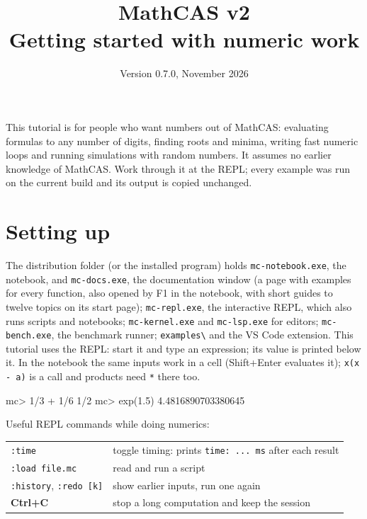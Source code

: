 \documentclass[11pt,a4paper]{article}
\title{\textbf{MathCAS v2}\\[4pt]\large Getting started with numeric work}
\author{}
\date{Version 0.7.0, November 2026}
\newcommand{\code}[1]{\texttt{#1}}
\begin{document}
\maketitle
\thispagestyle{empty}

\noindent This tutorial is for people who want numbers out of MathCAS: evaluating formulas to any number of
digits, finding roots and minima, writing fast numeric loops and running simulations with random numbers. It
assumes no earlier knowledge of MathCAS. Work through it at the REPL; every example was run on the current
build and its output is copied unchanged.

\tableofcontents

\section{Setting up}

The distribution folder (or the installed program) holds \code{mc-notebook.exe}, the notebook, and
\code{mc-docs.exe}, the documentation window (a page with examples for every function, also opened by F1 in the
notebook, with short guides to twelve topics on its start page); \code{mc-repl.exe}, the interactive REPL, which also
runs scripts and notebooks; \code{mc-kernel.exe} and \code{mc-lsp.exe} for editors; \code{mc-bench.exe}, the
benchmark runner; \code{examples\textbackslash} and the VS Code extension. This tutorial uses the REPL: start it and
type an expression; its value is printed below it. In the notebook the same inputs work in a cell
(Shift+Enter evaluates it); \code{x(x - a)} is a call and products need \code{*} there too.

\begin{repl}
mc> 1/3 + 1/6
1/2
mc> exp(1.5)
4.4816890703380645
\end{repl}

\noindent Useful REPL commands while doing numerics:

\begin{center}
\begin{tabular}{@{}ll@{}}
\toprule
\code{:time} & toggle timing: prints \code{time: ... ms} after each result \\
\code{:load file.mc} & read and run a script \\
\code{:history}, \code{:redo [k]} & show earlier inputs, run one again \\
\textbf{Ctrl+C} & stop a long computation and keep the session \\
\bottomrule
\end{tabular}
\end{center}
\end{document}
